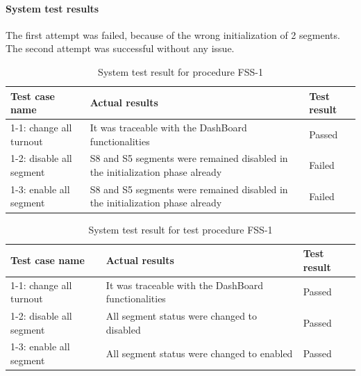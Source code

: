 \paragraph{System test results} The first attempt was failed, because of the wrong initialization of 2 segments. The second attempt was successful without any issue.
\begin{table}[ht]
	\caption{System test result for procedure FSS-1}
	\label{table:SystemTestProcedure-1-Result1}
	\begin{center}
		\renewcommand{\arraystretch}{1.8}
		\begin{tabu} 
			to 0.9 \textwidth
			{  X[1.5, c] X[1.5, c] X[c]  }
			\toprule
			Test case name           & Actual results                                                                & Test result \\ -1: change all turnout  & It was traceable with the DashBoard functionalities                           & Passed      \\
			1-2: disable all segment & S8 and S5 segments were remained disabled in the initialization phase already & Failed      \\
			1-3: enable all segment  & S8 and S5 segments were remained disabled in the initialization phase already & Failed      \\ \bottomrule
		\end{tabu}
	\end{center}
\end{table}
\begin{table}[ht]
	\caption{System test result for test procedure FSS-1}
	\label{table:SystemTestProcedure-1-Result2}
	\begin{center}
		\renewcommand{\arraystretch}{1.8}
		\begin{tabu} 
			to 0.9 \textwidth
			{  X[1.5, c] X[1.5, c] X[c] }
			\toprule
			Test case name           & Actual results                                      & Test result \\ -1: change all turnout  & It was traceable with the DashBoard functionalities & Passed      \\
			1-2: disable all segment & All segment status were changed to disabled         & Passed      \\
			1-3: enable all segment  & All segment status were changed to enabled          & Passed      \\ \bottomrule
		\end{tabu}
	\end{center}
\end{table}

